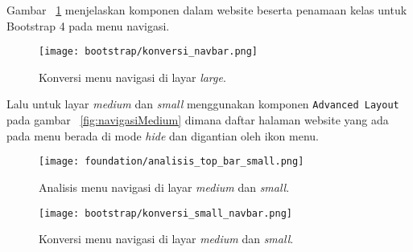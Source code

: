 \noindent Gambar ~\ref{fig:konversiNavigasi} menjelaskan komponen dalam website beserta penamaan kelas untuk Bootstrap 4 pada menu navigasi.\\
\begin{figure} [H]
	\centering  
	\texttt{[image: bootstrap/konversi\_navbar.png]}  
	\caption{Konversi menu navigasi di layar \textit{large}.} 
	\label{fig:konversiNavigasi}
\end{figure}

\noindent Lalu untuk layar \textit{medium} dan \textit{small} menggunakan komponen \texttt{Advanced Layout} pada gambar ~\ref{fig:navigasiMedium} dimana  daftar halaman website yang ada pada menu berada di mode \textit{hide} dan digantian oleh ikon menu. 

\begin{figure} [H]
	\centering  
	\texttt{[image: foundation/analisis\_top\_bar\_small.png]} 
	\caption{Analisis menu navigasi di layar \textit{medium} dan \textit{small}.} 
	\label{fig:navFoundation}
\end{figure} \noindent
\begin{figure} [H]
	\centering  
	\texttt{[image: bootstrap/konversi\_small\_navbar.png]} 
	\caption{Konversi menu navigasi di layar \textit{medium} dan \textit{small}.} 
	\label{fig:navBootstrap}
\end{figure} \noindent


